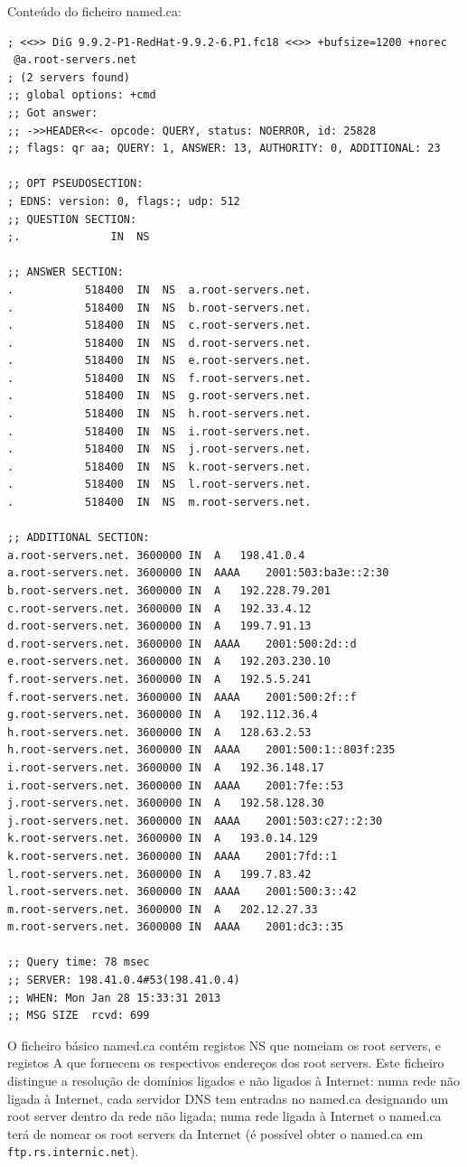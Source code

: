 Conteúdo do ficheiro \textsf{named.ca}:

\begin{verbatim}
; <<>> DiG 9.9.2-P1-RedHat-9.9.2-6.P1.fc18 <<>> +bufsize=1200 +norec
 @a.root-servers.net
; (2 servers found)
;; global options: +cmd
;; Got answer:
;; ->>HEADER<<- opcode: QUERY, status: NOERROR, id: 25828
;; flags: qr aa; QUERY: 1, ANSWER: 13, AUTHORITY: 0, ADDITIONAL: 23

;; OPT PSEUDOSECTION:
; EDNS: version: 0, flags:; udp: 512
;; QUESTION SECTION:
;.				IN	NS

;; ANSWER SECTION:
.			518400	IN	NS	a.root-servers.net.
.			518400	IN	NS	b.root-servers.net.
.			518400	IN	NS	c.root-servers.net.
.			518400	IN	NS	d.root-servers.net.
.			518400	IN	NS	e.root-servers.net.
.			518400	IN	NS	f.root-servers.net.
.			518400	IN	NS	g.root-servers.net.
.			518400	IN	NS	h.root-servers.net.
.			518400	IN	NS	i.root-servers.net.
.			518400	IN	NS	j.root-servers.net.
.			518400	IN	NS	k.root-servers.net.
.			518400	IN	NS	l.root-servers.net.
.			518400	IN	NS	m.root-servers.net.

;; ADDITIONAL SECTION:
a.root-servers.net.	3600000	IN	A	198.41.0.4
a.root-servers.net.	3600000	IN	AAAA	2001:503:ba3e::2:30
b.root-servers.net.	3600000	IN	A	192.228.79.201
c.root-servers.net.	3600000	IN	A	192.33.4.12
d.root-servers.net.	3600000	IN	A	199.7.91.13
d.root-servers.net.	3600000	IN	AAAA	2001:500:2d::d
e.root-servers.net.	3600000	IN	A	192.203.230.10
f.root-servers.net.	3600000	IN	A	192.5.5.241
f.root-servers.net.	3600000	IN	AAAA	2001:500:2f::f
g.root-servers.net.	3600000	IN	A	192.112.36.4
h.root-servers.net.	3600000	IN	A	128.63.2.53
h.root-servers.net.	3600000	IN	AAAA	2001:500:1::803f:235
i.root-servers.net.	3600000	IN	A	192.36.148.17
i.root-servers.net.	3600000	IN	AAAA	2001:7fe::53
j.root-servers.net.	3600000	IN	A	192.58.128.30
j.root-servers.net.	3600000	IN	AAAA	2001:503:c27::2:30
k.root-servers.net.	3600000	IN	A	193.0.14.129
k.root-servers.net.	3600000	IN	AAAA	2001:7fd::1
l.root-servers.net.	3600000	IN	A	199.7.83.42
l.root-servers.net.	3600000	IN	AAAA	2001:500:3::42
m.root-servers.net.	3600000	IN	A	202.12.27.33
m.root-servers.net.	3600000	IN	AAAA	2001:dc3::35

;; Query time: 78 msec
;; SERVER: 198.41.0.4#53(198.41.0.4)
;; WHEN: Mon Jan 28 15:33:31 2013
;; MSG SIZE  rcvd: 699
\end{verbatim}

O ficheiro básico named.ca contém registos NS que nomeiam os root
servers, e registos A que fornecem os respectivos endereços dos root
servers. Este ficheiro distingue a resolução de domínios ligados e não
ligados à Internet: numa rede não ligada à Internet, cada servidor DNS
tem entradas no named.ca designando um root server dentro da rede não
ligada; numa rede ligada à Internet o named.ca terá de nomear os root
servers da Internet (é possível obter o named.ca em
\texttt{ftp.rs.internic.net}).


